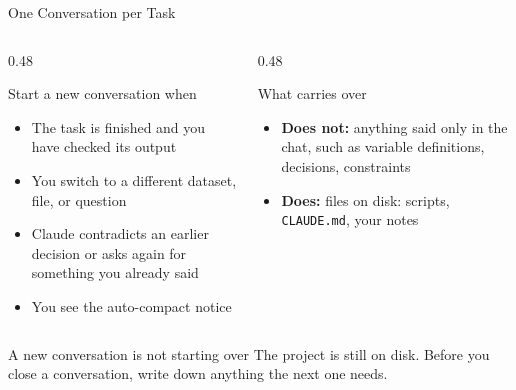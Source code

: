 \documentclass[aspectratio=169, 11pt]{beamer}
\begin{document}
\begin{frame}{One Conversation per Task}
  \small
  \begin{columns}[T]
    \begin{column}{0.48\textwidth}
      \begin{block}{Start a new conversation when}
        \begin{itemize}
          \item The task is finished and you have checked its output
          \item You switch to a different dataset, file, or question
          \item Claude contradicts an earlier decision or asks again for something you already said
          \item You see the auto-compact notice
        \end{itemize}
      \end{block}
    \end{column}
    \begin{column}{0.48\textwidth}
      \begin{block}{What carries over}
        \begin{itemize}
          \item \textbf{Does not:} anything said only in the chat, such as variable definitions, decisions, constraints
          \item \textbf{Does:} files on disk: scripts, \texttt{CLAUDE.md}, your notes
        \end{itemize}
      \end{block}
    \end{column}
  \end{columns}

  \vspace{0.5em}
  \begin{alertblock}{A new conversation is not starting over}
    The project is still on disk. Before you close a conversation, write down anything the next one needs.
  \end{alertblock}
\end{frame}
\end{document}
